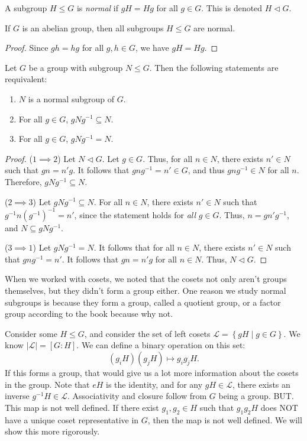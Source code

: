 \begin{definition}\label{dfn:norm}
	A subgroup $H\leq G$ is \emph{normal} if $gH=Hg$ for all $g\in G$. This is denoted $H\triangleleft G$.
\end{definition}
\begin{proposition}
	If $G$ is an abelian group, then all subgroups $H\leq G$ are normal.
\end{proposition}
\begin{proof}
	Since $gh=hg$ for all $g,h\in G$, we have $gH=Hg$.
\end{proof}
\begin{theorem}\label{thm:kj}
	Let $G$ be a group with subgroup $N\leq G$. Then the following statements are requivalent:
	\begin{enumerate}
		\item $N$ is a normal subgroup of $G$.
		\item For all $g\in G$, $gNg^{-1}\subseteq N$.
		\item For all $g\in G$, $gNg^{-1}=N$.
	\end{enumerate}
\end{theorem}
\begin{proof}
	($1\implies 2$) Let $N\triangleleft G$. Let $g\in G$. Thus, for all $n\in N$, there exists $n'\in N$ such that $gn=n'g$. It follows that $gng^{-1}=n'\in G$, and thus $gng^{-1}\in N$ for all $n$. Therefore, $gNg^{-1}\subseteq N$.

	($2\implies 3$) Let $gNg^{-1}\subseteq N$. For all $n\in N$, there exists $n'\in N$ such that $g^{-1}n\left( g^{-1} \right) ^{-1}=n'$, since the statement holds for \emph{all} $g\in G$. Thus, $n=gn'g^{-1}$, and $N\subseteq gNg^{-1}$.

	($3\implies 1$) Let $gNg^{-1}=N$. It follows that for all $n\in N$, there exists $n'\in N$ such that $gng^{-1}=n'$. It follows that $gn=n'g$ for all $n\in N$. Thus, $N\triangleleft G$.
\end{proof}

When we worked with cosets, we noted that the cosets not only aren't groups themselves, but they didn't form a group either. One reason we study normal subgroups is because they form a group, called a quotient group, or a factor group according to the book because why not.

Consider some $H\leq G$, and consider the set of left cosets $\mathcal{L} =\left\{ gH \mid g\in G \right\} $. We know $\left| \mathcal{L}  \right| =\left[ G:H \right]  $. We can define a binary operation on this set:
\[
	(g_iH)(g_jH)\mapsto g_ig_jH
.\]
If this forms a group, that would give us a lot more information about the cosets in the group. Note that $eH$ is the identity, and for any $gH\in \mathcal{L} $, there exists an inverse $g^{-1}H\in \mathcal{L} $. Associativity and closure follow from $G$ being a group. BUT. This map is not well defined. If there exist $g_1,g_2\in H$ such that $g_1g_2H$ does NOT have a unique coset representative in $G$, then the map is not well defined. We will show this more rigorously.

